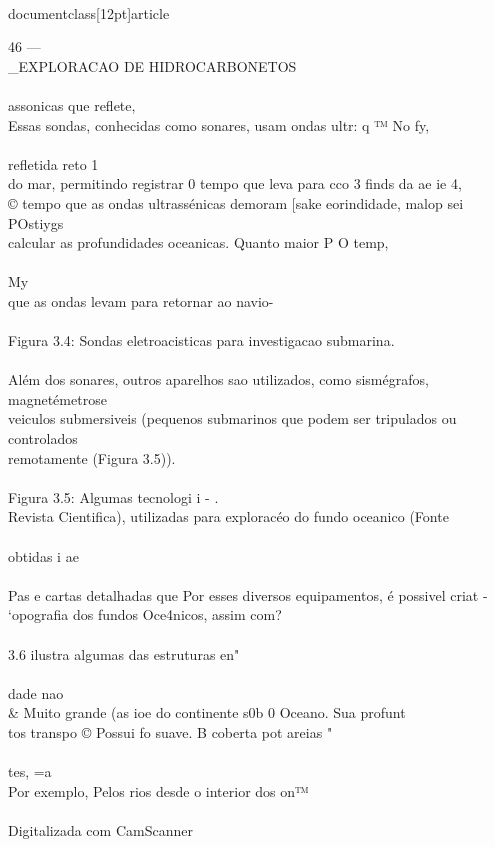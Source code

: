 \\documentclass[12pt]{article}
\begin{document}
46 —\\_EXPLORACAO DE HIDROCARBONETOS\\
\\
assonicas que reflete,\\
Essas sondas, conhecidas como sonares, usam ondas ultr: q ™ No fy,\\
\\
refletida reto 1\\
do mar, permitindo registrar 0 tempo que leva para cco 3 finds da ae ie 4,\\
© tempo que as ondas ultrassénicas demoram [sake eorindidade, malop sei POstiygs\\
calcular as profundidades oceanicas. Quanto maior P O temp,\\
\\
My\\
que as ondas levam para retornar ao navio-\\
\\
Figura 3.4: Sondas eletroacisticas para investigacao submarina.\\
\\
Além dos sonares, outros aparelhos sao utilizados, como sismégrafos, magnetémetrose\\
veiculos submersiveis (pequenos submarinos que podem ser tripulados ou controlados\\
remotamente (Figura 3.5)).\\
\\
Figura 3.5: Algumas tecnologi i - .\\
Revista Cientifica), utilizadas para exploracéo do fundo oceanico (Fonte\\
\\
obtidas i ae\\
\\
Pas e cartas detalhadas que Por esses diversos equipamentos, é possivel criat -\\
‘opografia dos fundos Oce4nicos, assim com?\\
\\
3.6 ilustra algumas das estruturas en"\\
\\
dade nao \\& Muito grande (as ioe do continente s0b 0 Oceano. Sua profunt\\
tos transpo © Possui fo suave. B coberta pot areias "\\
\\
tes, =a\\
Por exemplo, Pelos rios desde o interior dos on™\\
\\
Digitalizada com CamScanner\\
\end{document}

